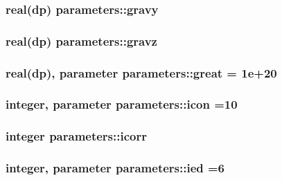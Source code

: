 \hypertarget{classparameters_a1c4c7a835c45fa35247a54b67df693aa}{
\subsubsection[{gravy}]{\setlength{\rightskip}{0pt plus 5cm}real(dp) parameters\-::gravy}}\label{classparameters_a1c4c7a835c45fa35247a54b67df693aa}
\hypertarget{classparameters_a0eaec95bb976c2d04268f81b448339ad}{
\subsubsection[{gravz}]{\setlength{\rightskip}{0pt plus 5cm}real(dp) parameters\-::gravz}}\label{classparameters_a0eaec95bb976c2d04268f81b448339ad}
\hypertarget{classparameters_a0661d83c6bd642cf4b90d65de20ada6d}{
\subsubsection[{great}]{\setlength{\rightskip}{0pt plus 5cm}real(dp), parameter parameters\-::great = 1e+20}}\label{classparameters_a0661d83c6bd642cf4b90d65de20ada6d}
\hypertarget{classparameters_a328601eb15a83d809d9e1bfafe85411d}{
\subsubsection[{icon}]{\setlength{\rightskip}{0pt plus 5cm}integer, parameter parameters\-::icon =10}}\label{classparameters_a328601eb15a83d809d9e1bfafe85411d}
\hypertarget{classparameters_ad9c135806011c8d812a818c336ca71ef}{
\subsubsection[{icorr}]{\setlength{\rightskip}{0pt plus 5cm}integer parameters\-::icorr}}\label{classparameters_ad9c135806011c8d812a818c336ca71ef}
\hypertarget{classparameters_ac77a69b8a24a91643db10d9f435aefa0}{
\subsubsection[{ied}]{\setlength{\rightskip}{0pt plus 5cm}integer, parameter parameters\-::ied =6}}\label{classparameters_ac77a69b8a24a91643db10d9f435aefa0}
